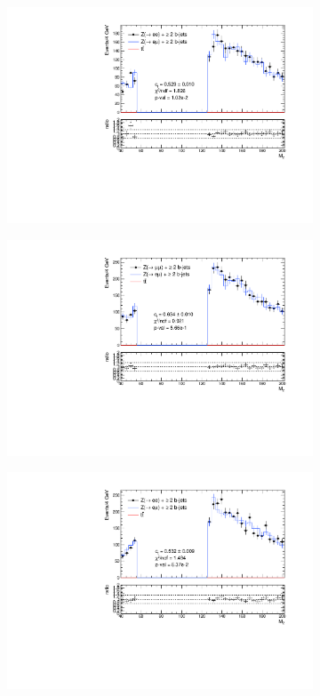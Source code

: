 \documentclass{article}
\begin{document}
\begin{figure}
\caption{Z Mass analysis with 4 GeV bins}
\begin{center}
	\begin{subfigure}[b]{0.45\textwidth}
		\includegraphics[width=\linewidth]{Zee_ZMass_2016.pdf}
	\end{subfigure}
	\begin{subfigure}[b]{0.45\textwidth}
		\includegraphics[width=\linewidth]{Zmm_ZMass_2016.pdf}
	\end{subfigure}
	\begin{subfigure}[b]{0.45\textwidth}
		\includegraphics[width=\linewidth]{Zee_ZMass_2017.pdf}

\end{subfigure}
\end{center}
\end{figure}
\end{document}

